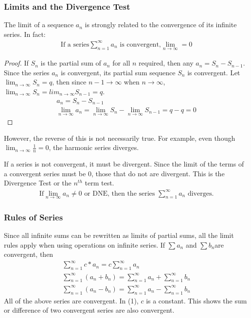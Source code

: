 \documentclass{article}
\begin{document}
\subsubsection{Limits and the Divergence Test}
The limit of a sequence $a_n$ is strongly related to the convergence of its infinite series. In fact:
\begin{gather*}
    \textrm{If a series} \sum_{n = 1}^\infty a_n \textrm{ is convergent,}\lim_{n \to \infty} = 0
\end{gather*}
\begin{proof}
If $S_n$ is the partial sum of $a_n$ for all $n$ required, then any $a_n = S_n - S_{n-1}$. Since the series $a_n$ is convergent, its partial sum sequence $S_n$ is convergent. Let $\lim_{n \to \infty} S_n = q$, then since $n-1 \to \infty$ when $n \to \infty$, $\lim_{n \to \infty} S_n= lim_{n \to \infty} S_{n-1}= q.$
\begin{gather*}
    a_n = S_n - S_{n-1}\\
    \lim_{n \to \infty} a_n = \lim_{n \to \infty} S_n - \lim_{n \to \infty} S_{n-1} = q - q = 0
\end{gather*}
\end{proof}
However, the reverse of this is not necessarily true. For example, even though $\lim_{n \to \infty} \frac{1}{n} = 0$, the harmonic series diverges.

If a series is not convergent, it must be divergent. Since the limit of the terms of a convergent series must be 0, those that do not are divergent. This is the Divergence Test or the $n^{th}$ term test.
\begin{gather*}
    \textrm{If}\lim_{n \to \infty} a_n \neq 0 \textrm{ or DNE, then the series } \sum_{n = 1}^\infty a_n \textrm{ diverges.}
\end{gather*}
\subsubsection{Rules of Series}
Since all infinite sums can be rewritten as limits of partial sums, all the limit rules apply when using operations on infinite series. If $\sum a_n$ and $\sum b_n$are convergent, then
\begin{gather}
    \sum_{n = 1}^\infty c * a_n = c\sum_{n = 1}^\infty a_n\\
    \sum_{n = 1}^\infty(a_n + b_n) = \sum_{n = 1}^\infty a_n + \sum_{n = 1}^\infty b_n\\
    \sum_{n = 1}^\infty(a_n - b_n) = \sum_{n = 1}^\infty a_n - \sum_{n = 1}^\infty b_n
\end{gather}
All of the above series are convergent. In (1), $c$ is a constant. This shows the sum or difference of two convergent series are also convergent.
\end{document}
